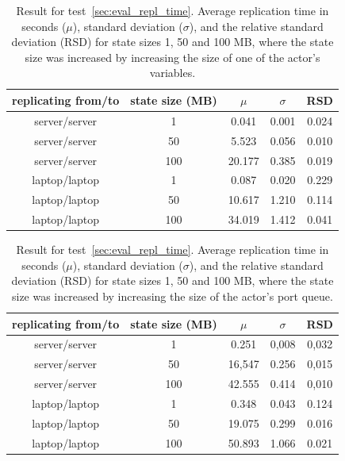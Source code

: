 \documentclass{cslthse-msc}
\begin{document}
 \begin{table}[h!]
	\begin{center}
	\begin{tabular}{| c | c | c | c | c |}
	 \hline
	 replicating from/to & state size (MB) & $\mu$ & $\sigma$ & RSD \\
	 \hline		%
	  server/server & 1 & 0.041 & 0.001 & 0.024 \\
	  server/server & 50 &  5.523 &  0.056 & 0.010 \\
	  server/server & 100 &  20.177 & 0.385 & 0.019 \\
	  laptop/laptop & 1 & 0.087 & 0.020 & 0.229 \\
	  laptop/laptop & 50 & 10.617 & 1.210 & 0.114 \\
	  laptop/laptop & 100 & 34.019 & 1.412 & 0.041 \\
	   \hline
	\end{tabular}
	 \caption{Result for test~\ref{sec:eval_repl_time}. Average replication time in seconds ($\mu$), standard deviation ($\sigma$), and the relative standard deviation (RSD) for state sizes 1, 50 and 100 MB, where the state size was increased by increasing the size of one of the actor's variables.}
	 \label{table:replication_time_variation_variable}
	 \end{center}
 \end{table}
 
\begin{table}[h!]
	\begin{center}
	\begin{tabular}{| c | c | c | c | c |}
	 \hline
	 replicating from/to & state size (MB) & $\mu$ & $\sigma$ & RSD \\
	 \hline		%
	  server/server & 1 & 0.251 & 0,008 & 0,032 \\
	  server/server & 50 & 16,547 & 0.256 & 0,015 \\
	  server/server & 100 & 42.555 & 0.414 & 0,010 \\
	  laptop/laptop & 1 & 0.348 & 0.043 & 0.124 \\
	  laptop/laptop & 50 & 19.075 & 0.299 & 0.016 \\
	  laptop/laptop & 100 & 50.893 & 1.066 & 0.021 \\
	   \hline
	\end{tabular}
	 \caption{Result for test~\ref{sec:eval_repl_time}. Average replication time in seconds ($\mu$), standard deviation ($\sigma$), and the relative standard deviation (RSD) for state sizes 1, 50 and 100 MB, where the state size was increased by increasing the size of the actor's port queue.}
	 \label{table:replication_time_variation_queue}
	 \end{center}
 \end{table}
 
\end{document}
